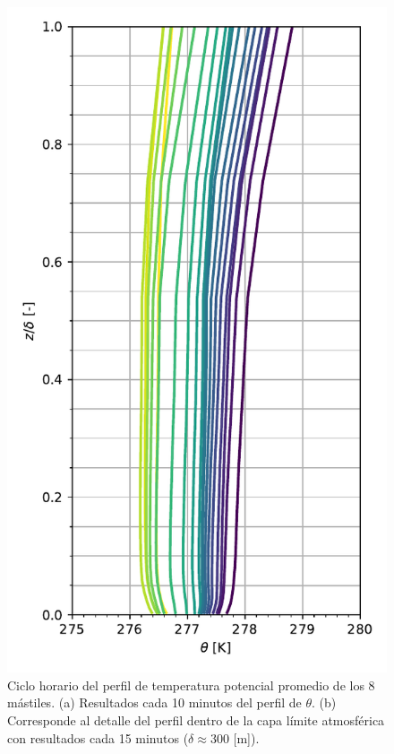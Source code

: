 \begin{figure}[H]
	\begin{minipage}{0.5\linewidth}
		\centering
		\includegraphics[width=0.9\linewidth,trim={0cm 5mm 0cm 0cm},clip]{Imagenes/06/bol/mean_profile}%
	\end{minipage}%
	
	
	
	\caption{Ciclo horario del perfil de temperatura potencial promedio de los 8 mástiles. (a) Resultados cada 10 minutos del perfil de $\theta$. (b) Corresponde al detalle del perfil dentro de la capa límite atmosférica con resultados cada 15 minutos ($\delta\approx300$ [m]).}
	\label{fig:06_bol_pbl}
\end{figure}


